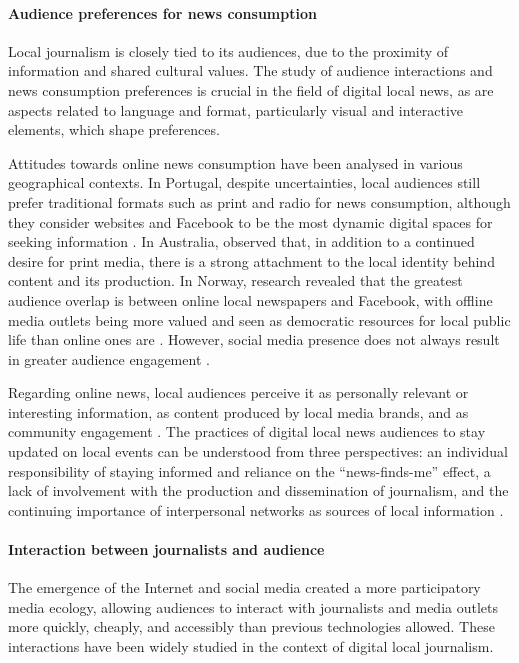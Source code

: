 \documentclass[english]{textolivre}
\begin{document}
\paragraph{Audience preferences for news consumption}
Local journalism is closely tied to its audiences, due to the proximity of information and shared cultural values. The study of audience interactions and news consumption preferences is crucial in the field of digital local news, as are aspects related to language and format, particularly visual and interactive elements, which shape preferences.

Attitudes towards online news consumption have been analysed in various geographical contexts. In Portugal, despite uncertainties, local audiences still prefer traditional formats such as print and radio for news consumption, although they consider websites and Facebook to be the most dynamic digital spaces for seeking information \cite{ribeiro2021}. In Australia, \textcite{hess2023} observed that, in addition to a continued desire for print media, there is a strong attachment to the local identity behind content and its production. In Norway, research revealed that the greatest audience overlap is between online local newspapers and Facebook, with offline media outlets being more valued and seen as democratic resources for local public life than online ones are \cite{olsen2020}. However, social media presence does not always result in greater audience engagement \cite{solvoll2020}.

Regarding online news, local audiences perceive it as personally relevant or interesting information, as content produced by local media brands, and as community engagement \cite{guyas2019}. The practices of digital local news audiences to stay updated on local events can be understood from three perspectives: an  individual responsibility of staying informed and reliance on the “news-finds-me” effect, a lack of involvement with the production and dissemination of journalism, and the continuing importance of interpersonal networks as sources of local information \cite{mccollough2017}.

\paragraph{Interaction between journalists and audience}
The emergence of the Internet and social media created a more participatory media ecology, allowing audiences to interact with journalists and media outlets more quickly, cheaply, and accessibly than previous technologies allowed. These interactions have been widely studied in the context of digital local journalism.
\end{document}
